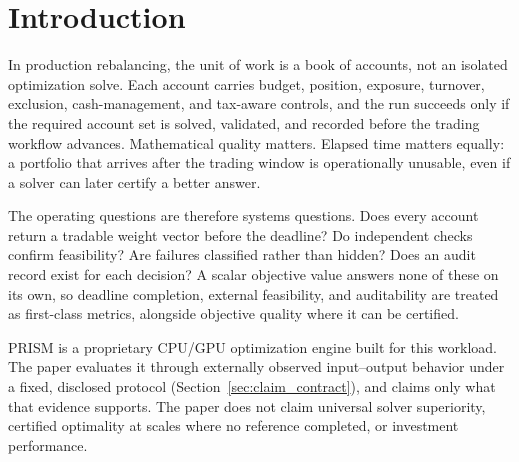 \documentclass[10pt,a4paper]{extarticle}
\begin{document}
\vspace{5pt}

\section{Introduction}
\label{sec:intro}

In production rebalancing, the unit of work is a book of accounts, not an
isolated optimization solve. Each account carries budget, position, exposure,
turnover, exclusion, cash-management, and tax-aware controls, and the run
succeeds only if the required account set is solved, validated, and recorded
before the trading workflow advances. Mathematical quality matters. Elapsed
time matters equally: a portfolio that arrives after the trading window is
operationally unusable, even if a solver can later certify a better answer.

The operating questions are therefore systems questions. Does every account
return a tradable weight vector before the deadline? Do independent checks
confirm feasibility? Are failures classified rather than hidden? Does an audit
record exist for each decision? A scalar objective value answers none of these
on its own, so deadline completion, external feasibility, and auditability are
treated as first-class metrics, alongside objective quality where it can be
certified.

PRISM is a proprietary CPU/GPU optimization engine built for this workload.
The paper evaluates it through externally observed input--output behavior
under a fixed, disclosed protocol (Section~\ref{sec:claim_contract}), and
claims only what that evidence supports. The paper does not claim universal
solver superiority, certified optimality at scales where no reference
completed, or investment performance.
\end{document}
